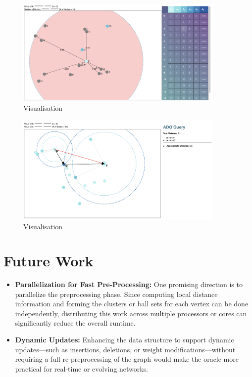 \documentclass{article}
\begin{document}
\begin{figure}
\begin{center}
    \includegraphics[width=0.9\textwidth]{img/v1.png}
    \caption{Visualisation}
    \label{fig:visualisation1}
\end{center}
\end{figure}

\begin{figure}
\begin{center}
    \includegraphics[width=0.9\textwidth]{img/v2.png}
    \caption{Visualisation}
    \label{fig:visualisation2}
\end{center}
\end{figure}

\section{Future Work}

\begin{itemize}
    \item \textbf{Parallelization for Fast Pre-Processing:} One promising direction is to parallelize the preprocessing phase. Since computing local distance information and forming the clusters or ball sets for each vertex can be done independently, distributing this work across multiple processors or cores can significantly reduce the overall runtime.
    
    \item \textbf{Dynamic Updates:} Enhancing the data structure to support dynamic updates—such as insertions, deletions, or weight modifications—without requiring a full re-preprocessing of the graph would make the oracle more practical for real-time or evolving networks.
\end{itemize}
\end{document}
